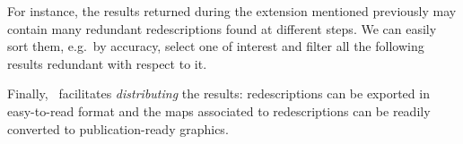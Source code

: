 For instance, the results returned during the extension
mentioned previously may contain many redundant redescriptions found
at different steps. We can easily sort them, e.g.\ by accuracy, select
one of interest and filter all the following results redundant with respect to it.

\label{sec:sharing-results}
Finally, \Siren\ facilitates \emph{distributing} the results:
redescriptions can be exported in easy-to-read format and the
maps associated to redescriptions can be readily converted to
publication-ready graphics. 

